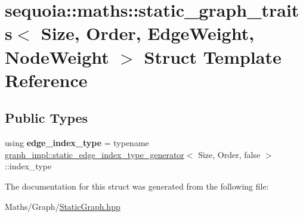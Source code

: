 \hypertarget{structsequoia_1_1maths_1_1static__graph__traits}{}\section{sequoia\+::maths\+::static\+\_\+graph\+\_\+traits$<$ Size, Order, Edge\+Weight, Node\+Weight $>$ Struct Template Reference}
\label{structsequoia_1_1maths_1_1static__graph__traits}
\subsection*{Public Types}
\begin{DoxyCompactItemize}
\item 
\mbox{\label{structsequoia_1_1maths_1_1static__graph__traits_ab9848c9ed5e44f7a18409e49d6b812a4}} 
using {\bfseries edge\+\_\+index\+\_\+type} = typename \mbox{\hyperlink{structsequoia_1_1maths_1_1graph__impl_1_1static__edge__index__type__generator}{graph\+\_\+impl\+::static\+\_\+edge\+\_\+index\+\_\+type\+\_\+generator}}$<$ Size, Order, false $>$\+::index\+\_\+type
\end{DoxyCompactItemize}


The documentation for this struct was generated from the following file\+:\begin{DoxyCompactItemize}
\item 
Maths/\+Graph/\mbox{\hyperlink{_static_graph_8hpp}{Static\+Graph.\+hpp}}\end{DoxyCompactItemize}

